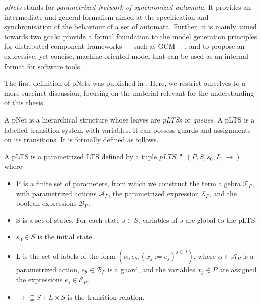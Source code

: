 	
		\textit{pNets} stands for \textit{parametrized Network of synchronized automata}. It provides
	an intermediate and general formalism aimed at the specification and synchronisation
	of the behaviour of a set of automata.	 Further, it is mainly aimed towards two goals:
	provide a formal foundation to the model generation principles for distributed component
	frameworks --- such as \ac{GCM} ---, and to propose an expressive, yet concise, machine-oriented 
	model that can be used as an internal format for software tools.
	
		The first definition of pNets was published in \cite{BBCHM:article2008}. Here, we restrict ourselves 
	to a more succinct discussion, focusing on the material relevant for the understanding of this thesis.	
	
		A pNet is a hierarchical structure whose leaves are \textit{pLTS}s or \textit{queues}. A pLTS is a labelled
	transition system with variables. It can possess guards and assignments on its transitions. It is formally
	defined as follows.

\begin{definition}[pLTS] 
\label{def:plts}

A pLTS is a parametrized LTS defined by a tuple $pLTS \triangleq (P, S, s_0, L, \rightarrow)$ where
\begin{itemize}
	\item P is a finite set of parameters, from which we construct the term algebra $\mathcal{T}_P$,
	         with parametrized actions $\mathcal{A}_P$, the parametrized expression $\mathcal{E}_P$,
	         and the boolean expressions $\mathcal{B}_P$.

	\item S is a set of states. For each state $s \in S$, variables of $s$ are global to the pLTS.
	
	\item $s_0 \in S$ is the initial state.
	
	\item L is the set of labels of the form $(\alpha, e_b, (x_j := e_j)^{j\in J})$, where $\alpha \in \mathcal{A}_P$
	is a parametrized action, $e_b \in \mathcal{B}_P$ is a guard, and the variables $x_j \in P$ are assigned the 
	expressions $e_j \in \mathcal{E}_P$. %
	
	\item $\rightarrow \subseteq S \times L \times S$ is the transition relation.
\end{itemize}
\end{definition}

